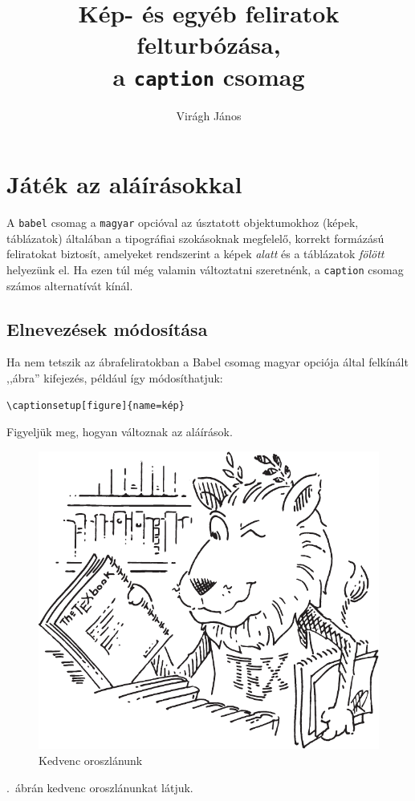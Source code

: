 \documentclass{article}
\title{Kép- és egyéb feliratok felturbózása,\\ a \texttt{caption} csomag}
\author{Virágh János}
\begin{document}
\maketitle
\tableofcontents
\listoftables
\listoffigures

\section{Játék az aláírásokkal}
A \texttt{babel} csomag a \texttt{magyar} opcióval az úsztatott objektumokhoz (képek, táblázatok) általában a tipográfiai szokásoknak megfelelő, korrekt formázású feliratokat biztosít, amelyeket rendszerint a képek \emph{alatt} és a táblázatok \emph{fölött} helyezünk el. Ha ezen túl még valamin változtatni szeretnénk, a \texttt{caption} csomag számos alternatívát kínál.
\subsection{Elnevezések módosítása}
Ha nem tetszik az ábrafeliratokban a  Babel csomag magyar opciója által felkínált ,,ábra'' kifejezés, például így módosíthatjuk:

\begin{verbatim}
\captionsetup[figure]{name=kép}
\end{verbatim}
\captionsetup[figure]{name=kép}

\noindent  Figyeljük meg, hogyan változnak az aláírások.
\begin{figure}[!htp]
  \begin{center}
   \includegraphics[scale=0.25]{Lion.pdf}
  \caption{Kedvenc oroszlánunk}
  \label{abra-oroszlanori}
  \end{center}
\end{figure}
.~ábrán kedvenc oroszlánunkat látjuk.
\end{document}
